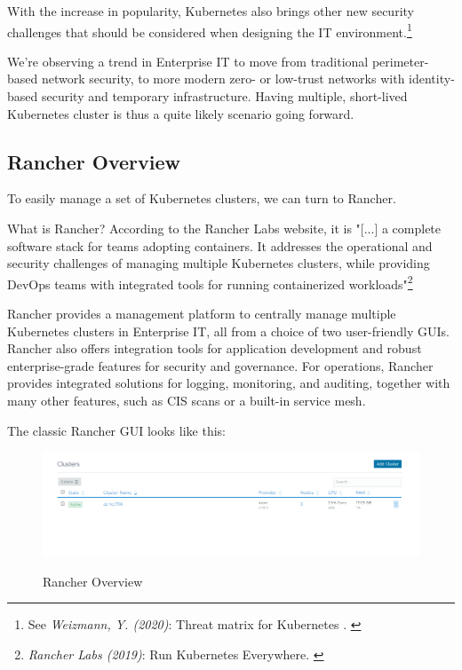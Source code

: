 With the increase in popularity, Kubernetes also brings other new security challenges that should be considered when designing the IT environment.\footnote{See \textit{Weizmann, Y. (2020)}: Threat matrix for Kubernetes . \cite{threatMatrix}}

We're observing a trend in Enterprise IT to move from traditional perimeter-based network security, to more modern zero- or low-trust networks with identity-based security and temporary infrastructure. Having multiple, short-lived Kubernetes cluster is thus a quite likely scenario going forward.

\subsection{Rancher Overview}

To easily manage a set of Kubernetes clusters, we can turn to Rancher.

What is Rancher? According to the Rancher Labs website, it is "[...] a complete software stack for teams adopting containers. It addresses the operational and security challenges of managing multiple Kubernetes clusters, while providing DevOps teams with integrated tools for running containerized workloads"\footnote{\textit{Rancher Labs (2019)}: Run Kubernetes Everywhere. \cite{rancher}}

Rancher provides a management platform to centrally manage multiple Kubernetes clusters in Enterprise IT, all from a choice of two user-friendly GUIs. Rancher also offers integration tools for application development and robust enterprise-grade features for security and governance. For operations, Rancher provides integrated solutions for logging, monitoring, and auditing, together with many other features, such as CIS scans or a built-in service mesh.

The classic Rancher GUI looks like this:

\begin{figure}[H]
\centering
\caption {Rancher Overview}
\includegraphics[width=\linewidth]{images/cluster-overview.png}
\label{fig:rancherOverview}
\end{figure}

